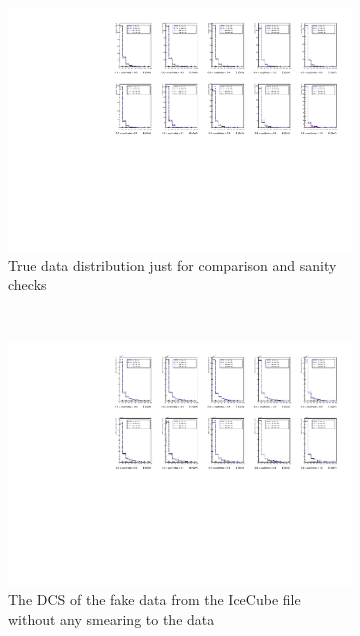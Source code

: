 \documentclass[12pt]{article}
\numberwithin{equation}{section}
\numberwithin{figure}{section}
\begin{document}
\begin{figure}
	\centering
	\begin{subfigure}{0.8\textwidth}
                \includegraphics[scale=0.59]{MCOriginal}
                \caption{True data distribution just for comparison and sanity checks}
                \label{fig:output_orig}
    \end{subfigure}\\
    \begin{subfigure}{0.8\textwidth}
                \includegraphics[scale=0.59]{MCUnfNoSmearing}
                \caption{The DCS of the fake data from the IceCube file without any smearing to the data}
                \label{fig:output_nosmear}
    \end{subfigure}\\
    \begin{subfigure}{0.8\textwidth}

\end{subfigure}
\end{figure}
\end{document}
